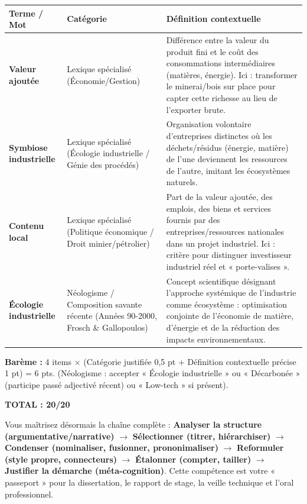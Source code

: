 \documentclass[11pt]{article}
\begin{document}
\begin{exoresolu}
\begin{center}
\begin{tabularx}{\linewidth}{|l|X|X|}\hline
\rowcolor{popblueL}
\textbf{Terme / Mot} & \textbf{Catégorie} & \textbf{Définition contextuelle} \\ \hline
\textbf{Valeur ajoutée} & Lexique spécialisé (Économie/Gestion) & Différence entre la valeur du produit fini et le coût des consommations intermédiaires (matières, énergie). Ici : transformer le minerai/bois sur place pour capter cette richesse au lieu de l'exporter brute. \\ \hline
\textbf{Symbiose industrielle} & Lexique spécialisé (Écologie industrielle / Génie des procédés) & Organisation volontaire d'entreprises distinctes où les déchets/résidus (énergie, matière) de l'une deviennent les ressources de l'autre, imitant les écosystèmes naturels. \\ \hline
\textbf{Contenu local} & Lexique spécialisé (Politique économique / Droit minier/pétrolier) & Part de la valeur ajoutée, des emplois, des biens et services fournis par des entreprises/ressources nationales dans un projet industriel. Ici : critère pour distinguer investisseur industriel réel et « porte-valises ». \\ \hline
\textbf{Écologie industrielle} & Néologisme / Composition savante récente (Années 90-2000, Frosch \& Gallopoulos) & Concept scientifique désignant l'approche systémique de l'industrie comme écosystème : optimisation conjointe de l'économie de matière, d'énergie et de la réduction des impacts environnementaux. \\ \hline
\end{tabularx}
\end{center}

\textbf{Barème :} 4 items $\times$ (Catégorie justifiée 0,5 pt + Définition contextuelle précise 1 pt) = 6 pts. (Néologisme : accepter « Écologie industrielle » ou « Décarbonée » (participe passé adjectivé récent) ou « Low-tech » si présent).

\vspace{0.3cm}
\textbf{TOTAL : 20/20}

\end{exoresolu}

\begin{aretenir}
Vous maîtrisez désormais la chaîne complète : \textbf{Analyser la structure (argumentative/narrative)} $\to$ \textbf{Sélectionner (titrer, hiérarchiser)} $\to$ \textbf{Condenser (nominaliser, fusionner, prononimaliser)} $\to$ \textbf{Reformuler (style propre, connecteurs)} $\to$ \textbf{Étalonner (compter, tailler)} $\to$ \textbf{Justifier la démarche (méta-cognition)}. Cette compétence est votre « passeport » pour la dissertation, le rapport de stage, la veille technique et l'oral professionnel.
\end{aretenir}
\end{document}
